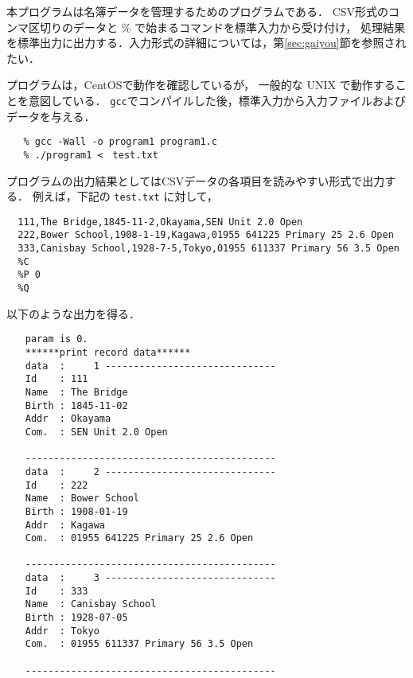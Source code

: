 \documentclass[a4j,11pt]{jarticle}
\begin{document}
本プログラムは名簿データを管理するためのプログラムである．
CSV形式のコンマ区切りのデータと \% で始まるコマンドを標準入力から受け付け，
処理結果を標準出力に出力する．入力形式の詳細については，第\ref{sec:gaiyou}節を参照されたい．

プログラムは，CentOSで動作を確認しているが，
一般的な UNIX で動作することを意図している．
\verb|gcc|でコンパイルした後，標準入力から入力ファイルおよびデータを与える．

{\fontsize{10pt}{11pt} \selectfont
 \begin{verbatim}
   % gcc -Wall -o program1 program1.c
   % ./program1 <　test.txt
 \end{verbatim}
}
プログラムの出力結果としてはCSVデータの各項目を読みやすい形式で出力する．
例えば，下記の \verb|test.txt| に対して，

{\fontsize{10pt}{11pt} \selectfont
 \begin{verbatim}
  111,The Bridge,1845-11-2,Okayama,SEN Unit 2.0 Open
  222,Bower School,1908-1-19,Kagawa,01955 641225 Primary 25 2.6 Open
  333,Canisbay School,1928-7-5,Tokyo,01955 611337 Primary 56 3.5 Open
  %C
  %P 0
  %Q
 \end{verbatim}
}
\noindent %
以下のような出力を得る．

{\fontsize{10pt}{11pt} \selectfont
 \begin{verbatim}
　　param is 0.
　　******print record data******
　　data  :     1 ------------------------------
　　Id    : 111
　　Name  : The Bridge
　　Birth : 1845-11-02
　　Addr  : Okayama
　　Com.  : SEN Unit 2.0 Open

　　--------------------------------------------
　　data  :     2 ------------------------------
　　Id    : 222
　　Name  : Bower School
　　Birth : 1908-01-19
　　Addr  : Kagawa
　　Com.  : 01955 641225 Primary 25 2.6 Open

　　--------------------------------------------
　　data  :     3 ------------------------------
　　Id    : 333
　　Name  : Canisbay School
　　Birth : 1928-07-05
　　Addr  : Tokyo
　　Com.  : 01955 611337 Primary 56 3.5 Open

　　--------------------------------------------

 \end{verbatim}
}
\end{document}
